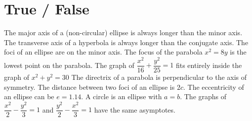 \documentclass[11pt]{exam}
\begin{document}
\section*{True / False}
\begin{questions}
\question[1] \tf[T] The major axis of a (non-circular) ellipse is always longer than the minor axis.
\question[1] \tf[F] The transverse axis of a hyperbola is always longer than the conjugate axis.
\question[1] \tf[F] The foci of an ellipse are on the minor axis.
\question[1] \tf[F] The focus of the parabola $x^2=8y$ is the lowest point on the parabola.
\question[1] \tf[T] The graph of $\dfrac{x^2}{16}+\dfrac{y^2}{25}=1$ fits entirely inside the graph of $x^2+y^2=30$
\question[1] \tf[T] The directrix of a parabola is perpendicular to the axis of symmetry.
\question[1] \tf[T] The distance between two foci of an ellipse is $2c$.
\question[1] \tf[T] The eccentricity of an ellipse can be $e=1.14$.
\question[1] \tf[T] A circle is an ellipse with $a=b$.
\question[1] \tf[F] The graphs of $\dfrac{x^2}{2}-\dfrac{y^2}{3} = 1$ and $\dfrac{y^2}{2}-\dfrac{x^2}{3} = 1$ have the same asymptotes.
\end{questions}

\vspace{3ex}
\clearpage
\end{document}
